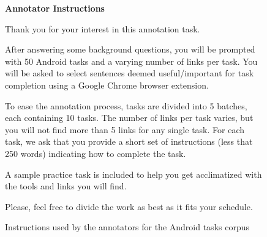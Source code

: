 

\begin{figure}[!htb]
\begin{mdframed}[backgroundcolor=gray!05] 
\begin{footnotesize}

{\large \textbf{Annotator Instructions}} \bigskip


Thank you for your interest in this annotation task. \bigskip
 
After answering some background questions, you will be prompted with 50 Android tasks and a varying number of links per task. You will be asked to select sentences deemed useful/important for task completion using a Google Chrome browser extension.  \bigskip


To ease the annotation process,  tasks are divided into 5 batches, each containing 10 tasks. The number of links per task varies, but you will not find more than 5 links for any single task. For each task, we ask that you provide a short set of instructions (less that 250 words) indicating how to complete the task. \bigskip

A sample practice task is included to help you get acclimatized with the tools and links you will find. \bigskip


Please, feel free to divide the work as best as it fits your schedule.


\end{footnotesize}
\end{mdframed}
\caption{Instructions used by the annotators for the Android tasks corpus}
\end{figure}

\vfill
